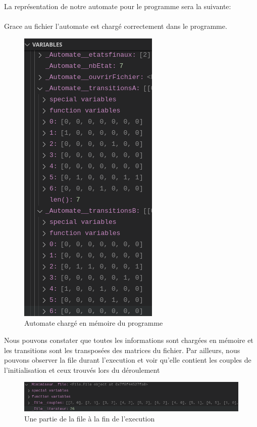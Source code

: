 \documentclass[a4paper]{article}
\begin{document}
La représentation de notre automate pour le programme sera la suivante:\\

\fbox{
	
}\\

Grace au fichier l'automate est chargé correctement dans le programme.\\

\begin{figure}[!h]
	\centering
	\includegraphics[scale=0.4]{src/autoCharge.png}
	\caption{Automate chargé en mémoire du programme}
\end{figure}

Nous pouvons constater que toutes les informations sont chargées en mémoire
et les transitions sont les transposées des matrices du fichier. Par ailleurs, 
nous pouvons observer la file durant l'execution et voir qu'elle contient
les couples de l'initialisation et ceux trouvés lors du déroulement

\begin{figure}[!h]
	\centering
	\includegraphics[scale=0.5]{src/fileExecution.png}
	\caption{Une partie de la file à la fin de l'execution}
\end{figure}
\end{document}
